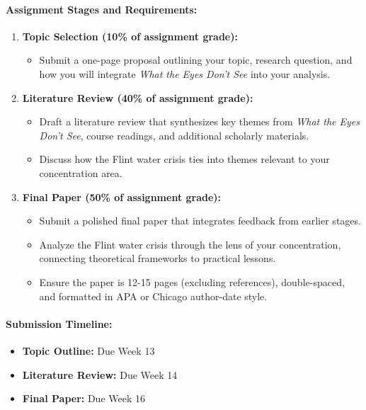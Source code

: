 \documentclass[12pt, letterpaper]{article}
\begin{document}
\paragraph*{Assignment Stages and Requirements:}
\begin{enumerate}
    \item \textbf{Topic Selection (10\% of assignment grade):}
    \begin{itemize}
        \item Submit a one-page proposal outlining your topic, research question, and how you will integrate \textit{What the Eyes Don’t See} into your analysis.
    \end{itemize}
    \item \textbf{Literature Review (40\% of assignment grade):}
    \begin{itemize}
        \item Draft a literature review that synthesizes key themes from \textit{What the Eyes Don’t See}, course readings, and additional scholarly materials.
        \item Discuss how the Flint water crisis ties into themes relevant to your concentration area.
    \end{itemize}
    \item \textbf{Final Paper (50\% of assignment grade):}
    \begin{itemize}
        \item Submit a polished final paper that integrates feedback from earlier stages.
        \item Analyze the Flint water crisis through the lens of your concentration, connecting theoretical frameworks to practical lessons.
        \item Ensure the paper is 12-15 pages (excluding references), double-spaced, and formatted in APA or Chicago author-date style.
    \end{itemize}
\end{enumerate}

\paragraph*{Submission Timeline:}
\begin{itemize}
    \item \textbf{Topic Outline:} Due Week 13
    \item \textbf{Literature Review:} Due Week 14
    \item \textbf{Final Paper:} Due Week 16
\end{itemize}
\end{document}
